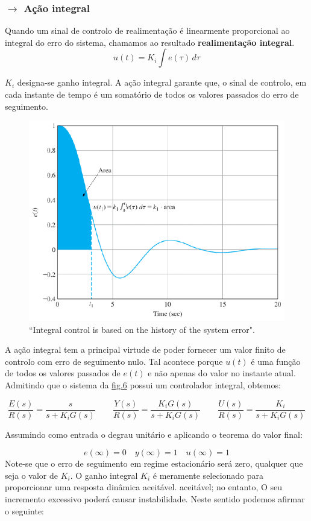 \subsubsection[3.4.2 Ação integral]{$\pmb{\rightarrow}$ Ação integral}
\noindent Quando um sinal de controlo de realimentação é linearmente proporcional ao integral do erro do sistema, chamamos ao resultado \textbf{realimentação integral}. 
$$
    u(t) = K_i \int e(\tau)\, d\tau
$$

\noindent $K_i$ designa-se ganho integral. A ação integral garante que, o sinal de controlo, em cada instante de tempo é um somatório de todos os valores passados do erro de seguimento.

\begin{figure}[H]
    \centering
    \includegraphics[width = 0.5\linewidth]{img/3/integral-control.png}
    \caption{``Integral control is based on the history of the system error"\cite{FranklinPowell2015}.}
    \label{fig:integral-control}
\end{figure}

\noindent A ação integral tem a principal virtude de poder fornecer um valor finito de controlo com erro de seguimento nulo. Tal acontece porque $u(t)$ é uma função de todos os valores passados de $e(t)$ e não apenas do valor no instante atual. Admitindo que o sistema da \hyperref[fig:feed-loop]{fig.6} possui um controlador integral, obtemos:

$$
    \dfrac{E(s)}{R(s)} = \dfrac{s}{s + K_i G(s)}\qquad
    \dfrac{Y(s)}{R(s)} = \dfrac{K_i G(s)}{s + K_i G(s)}\qquad
    \dfrac{U(s)}{R(s)} = \dfrac{K_i}{s + K_i G(s)}
$$

\noindent Assumindo como entrada o degrau unitário e aplicando o teorema do valor final:

$$
    e(\infty) = 0\quad
    y(\infty) = 1\quad
    u(\infty) = 1
$$
\noindent Note-se que o erro de seguimento em regime estacionário será zero, qualquer que seja o valor de $K_i$. O ganho integral $K_i$ é meramente selecionado para proporcionar uma resposta dinâmica aceitável. aceitável; no entanto, O seu incremento excessivo poderá causar instabilidade. Neste sentido podemos afirmar o seguinte:

